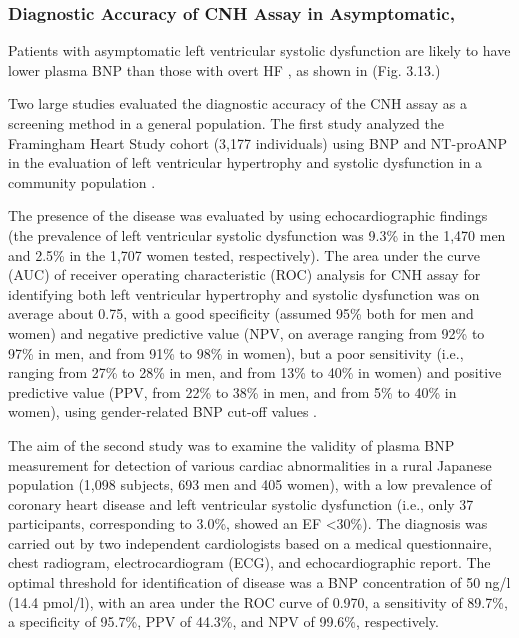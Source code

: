 \documentclass[14pt,a4paper,onecolumn]{extarticle}
\begin{document}
\subsubsection{ Diagnostic Accuracy of CNH Assay in Asymptomatic,}

Patients with asymptomatic left ventricular systolic dysfunction are likely to have lower plasma BNP than those with overt HF \citep{bib32} \citep{bib33} \citep{bib34} \citep{bib35} \citep{bib3131} \citep{bib335} \citep{bib362} \citep{bib363} \citep{bib364} \citep{bib365} \citep{bib366} \citep{bib372}, as shown in (Fig. 3.13.)

Two large studies \citep{bib39} \citep{bib366} evaluated the diagnostic accuracy of the CNH assay as a screening method in a general population. The first study analyzed the Framingham Heart Study cohort (3,177 individuals) using BNP and NT-proANP in the evaluation of left ventricular hypertrophy and systolic dysfunction in a community population \citep{bib39}.

The presence of the disease was evaluated by using echocardiographic findings (the prevalence of left ventricular systolic dysfunction was 9.3\% in the 1,470 men and 2.5\% in the 1,707 women tested, respectively). The area under the curve (AUC) of receiver operating characteristic (ROC) analysis for CNH assay for identifying both left ventricular hypertrophy and systolic dysfunction was on average about 0.75, with a good specificity (assumed 95\% both for men and women) and negative predictive value (NPV, on average ranging from 92\% to 97\% in men, and from 91\% to 98\% in women), but a poor sensitivity (i.e., ranging from 27\% to 28\% in men, and from 13\% to 40\% in women) and positive predictive value (PPV, from 22\% to 38\% in men, and from 5\% to 40\% in women), using gender-related BNP cut-off values \citep{bib39}.

The aim of the second study was to examine the validity of plasma BNP measurement for detection of various cardiac abnormalities in a rural Japanese population (1,098 subjects, 693 men and 405 women), with a low prevalence of coronary heart disease and left ventricular systolic dysfunction (i.e., only 37 participants, corresponding to 3.0\%, showed an EF <30\%). The diagnosis was carried out by two independent cardiologists based on a medical questionnaire, chest radiogram, electrocardiogram (ECG), and echocardiographic report. The optimal threshold for identification of disease was a BNP concentration of 50 ng/l (14.4 pmol/l), with an area under the ROC curve of 0.970, a sensitivity of 89.7\%, a specificity of 95.7\%, PPV of 44.3\%, and NPV of 99.6\%, respectively. \citep{bib366}
\end{document}
